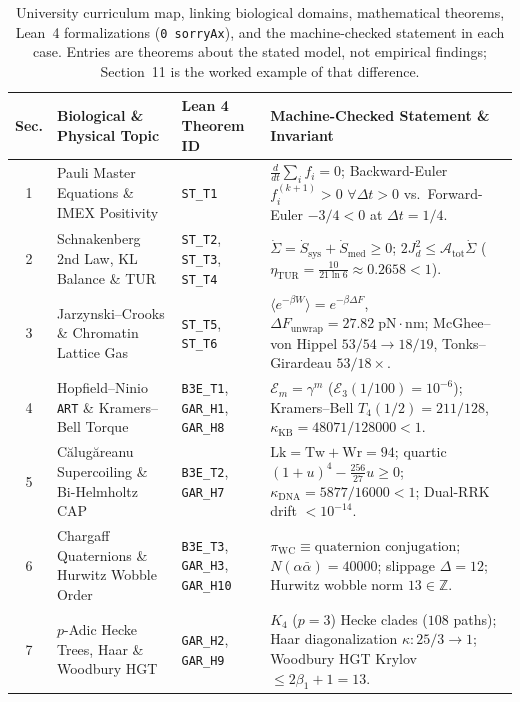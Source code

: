 \documentclass[11pt,a4paper]{article}
\theoremstyle{definition}
\theoremstyle{remark}
\begin{document}
\begin{table}[htbp]
\centering
\caption{University curriculum map, linking biological domains, mathematical theorems, Lean~4 formalizations (\texttt{0 sorryAx}), and the machine-checked statement in each case. Entries are theorems about the stated model, not empirical findings; Section~11 is the worked example of that difference.}
\label{tab:curriculum_map}
\footnotesize
\begin{tabularx}{\textwidth}{@{}c l l X@{}}
\toprule
\textbf{Sec.} & \textbf{Biological \& Physical Topic} & \textbf{Lean 4 Theorem ID} & \textbf{Machine-Checked Statement \& Invariant} \\
\midrule
1 & Pauli Master Equations \& IMEX Positivity & \texttt{ST\_T1} & $\frac{d}{dt}\sum_i f_i = 0$; Backward-Euler $f_i^{(k+1)} > 0$ $\forall \Delta t > 0$ vs.\ Forward-Euler $-3/4 < 0$ at $\Delta t = 1/4$. \\
2 & Schnakenberg 2nd Law, KL Balance \& TUR & \texttt{ST\_T2}, \texttt{ST\_T3}, \texttt{ST\_T4} & $\dot{\Sigma} = \dot{S}_{\mathrm{sys}} + \dot{S}_{\mathrm{med}} \ge 0$; $2J_d^2 \le \mathcal{A}_{\mathrm{tot}}\dot{\Sigma}$ ($\eta_{\mathrm{TUR}} = \frac{10}{21\ln 6} \approx 0.2658 < 1$). \\
3 & Jarzynski--Crooks \& Chromatin Lattice Gas & \texttt{ST\_T5}, \texttt{ST\_T6} & $\langle e^{-\beta W}\rangle = e^{-\beta\Delta F}$, $\Delta F_{\mathrm{unwrap}} = 27.82\;\mathrm{pN\cdot nm}$; McGhee--von Hippel $53/54 \to 18/19$, Tonks--Girardeau $53/18\times$. \\
4 & Hopfield--Ninio \texttt{ART} \& Kramers--Bell Torque & \texttt{B3E\_T1}, \texttt{GAR\_H1}, \texttt{GAR\_H8} & $\mathcal{E}_m = \gamma^m$ ($\mathcal{E}_3(1/100) = 10^{-6}$); Kramers--Bell $T_4(1/2) = 211/128$, $\kappa_{\mathrm{KB}} = 48071/128000 < 1$. \\
5 & C\u{a}lug\u{a}reanu Supercoiling \& Bi-Helmholtz CAP & \texttt{B3E\_T2}, \texttt{GAR\_H7} & $\mathrm{Lk} = \mathrm{Tw} + \mathrm{Wr} = 94$; quartic $(1+u)^4 - \frac{256}{27}u \ge 0$; $\kappa_{\mathrm{DNA}} = 5877/16000 < 1$; Dual-RRK drift $< 10^{-14}$. \\
6 & Chargaff Quaternions \& Hurwitz Wobble Order & \texttt{B3E\_T3}, \texttt{GAR\_H3}, \texttt{GAR\_H10} & $\pi_{\mathrm{WC}} \equiv \text{quaternion conjugation}$; $N(\alpha\bar{\alpha}) = 40000$; slippage $\Delta = 12$; Hurwitz wobble norm $13 \in \mathbb{Z}$. \\
7 & $p$-Adic Hecke Trees, Haar \& Woodbury HGT & \texttt{GAR\_H2}, \texttt{GAR\_H9} & $K_4$ ($p=3$) Hecke clades ($108$ paths); Haar diagonalization $\kappa : 25/3 \to 1$; Woodbury HGT Krylov $\le 2\beta_1 + 1 = 13$. \\

\end{tabularx}
\end{table}
\end{document}
